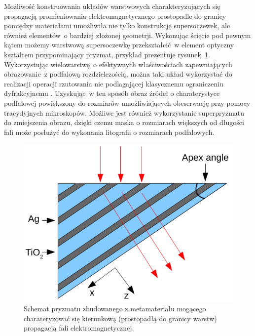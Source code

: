 Możliwość konstruowania układów warstwowych charakteryzujących się propagacją promieniowania elektromagnetycznego prostopadle do granicy pomiędzy materiałami umożliwiła nie tylko konstrukcję supersoczewek, ale również elementów~o bardziej złożonej geometrji. Wykonując ścięcie pod pewnym kątem możemy warstwową supersoczewkę przekształcić~w element optyczny kształtem przypominający pryzmat, przykład prezentuje rysunek~\ref{fig:prism-schema}. Wykorzystując wielowarstwę~o efektywnych właściwościach zapewniających obrazowanie~z podfalową rozdzielczością, można taki układ wykorzystać do realizacji operacji rzutowania nie podlagającej klasycznemu ograniczeniu dyfrakcyjnemu  \cite{prism2010}. Uzyskując~w ten sposób obraz źródeł o charaterystyce podfalowej powiększony do rozmiarów umożliwiających obeserwację przy pomocy tracydyjnych mikroskopów. Możliwe jest również wykorzystanie superpryzmatu do zmiejszenia obrazu, dzięki czemu maska o rozmiarach większych od długości fali może posłużyć do wykonania litografii o rozmiarach podfalowych.

			\begin{figure}[tbH]
				\includegraphics[width=\textwidth]{images/multilayer/prism.png}
				\caption{Schemat pryzmatu zbudowanego z metamateriału mogącego charateryzować się kierunkową (prostopadłą do granicy warstw) propagacją fali elektromagnetycznej.}
				\label{fig:prism-schema}
			\end{figure}


